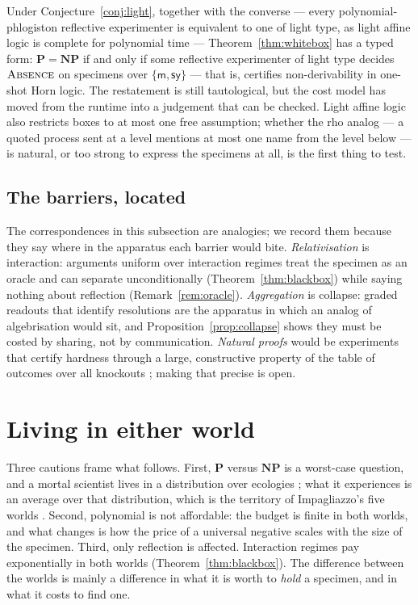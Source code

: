 \documentclass[11pt]{article}
\theoremstyle{definition}
\theoremstyle{plain}
\theoremstyle{remark}
\DeclareRobustCommand{\S}{\ifmmode\mathsection\else$\mathsection$\fi}
\newcommand{\ABS}{\textup{\textsc{Absence}}}
\newcommand{\Pclass}{\mathbf{P}}
\newcommand{\NPclass}{\mathbf{NP}}
\newcommand{\cm}{\mathsf{m}}
\newcommand{\csy}{\mathsf{sy}}
\begin{document}
\noindent
Under Conjecture~\ref{conj:light}, together with the converse --- every
polynomial-phlogiston reflective experimenter is equivalent to one of
light type, as light affine logic is complete for polynomial time ---
Theorem~\ref{thm:whitebox} has a typed form: $\Pclass = \NPclass$ if and only if some reflective experimenter of
light type decides $\ABS$ on specimens over $\{\cm, \csy\}$ --- that is,
certifies non-derivability in one-shot Horn logic. The restatement is
still tautological, but the cost model has moved from the runtime into a
judgement that can be checked. Light affine logic also restricts boxes to
at most one free assumption; whether the rho analog --- a quoted process
sent at a level mentions at most one name from the level below --- is
natural, or too strong to express the specimens at all, is the first
thing to test.

\subsection{The barriers, located}\label{sec:barriers}

The correspondences in this subsection are analogies; we record them
because they say where in the apparatus each barrier would bite.
\emph{Relativisation} is interaction: arguments uniform over interaction
regimes treat the specimen as an oracle and can separate unconditionally
(Theorem~\ref{thm:blackbox}) while saying nothing about reflection
(Remark~\ref{rem:oracle}). \emph{Aggregation} is collapse: graded
readouts that identify resolutions are the apparatus in which an analog
of algebrisation would sit, and Proposition~\ref{prop:collapse} shows
they must be costed by sharing, not by communication. \emph{Natural
proofs} would be experiments that certify hardness through a large,
constructive property of the table of outcomes over all knockouts
\cite{RazborovRudich97}; making that precise is open.

\section{Living in either world}\label{sec:worlds}

Three cautions frame what follows. First, $\Pclass$ versus $\NPclass$ is
a worst-case question, and a mortal scientist lives in a distribution over
ecologies \cite[\S``Distributions over ecologies'']{Scientist}; what it experiences is an average over
that distribution, which is the territory of Impagliazzo's five worlds
\cite{Impagliazzo95}. Second, polynomial is not affordable: the budget is
finite in both worlds, and what changes is how the price of a universal
negative scales with the size of the specimen. Third, only reflection is
affected. Interaction regimes pay exponentially in both worlds
(Theorem~\ref{thm:blackbox}). The difference between the worlds is
mainly a difference in what it is worth to \emph{hold} a specimen, and in
what it costs to find one.
\end{document}
